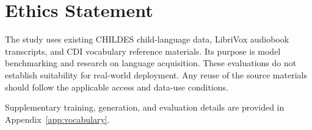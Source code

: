 \section{Ethics Statement}

The study uses existing CHILDES child-language data, LibriVox audiobook transcripts, and CDI vocabulary reference materials. Its purpose is model benchmarking and research on language acquisition. These evaluations do not establish suitability for real-world deployment. Any reuse of the source materials should follow the applicable access and data-use conditions.




%

Supplementary training, generation, and evaluation details are provided in Appendix~\ref{app:vocabulary}.

